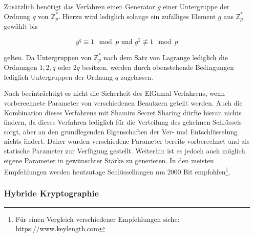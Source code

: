   Zusätzlich benötigt das Verfahren einen Generator \(g\) einer Untergruppe der Ordnung \(q\) von \(\mathbb{Z}_p^*\). Hierzu wird lediglich solange ein zufälliges Element \(g\) aus \(\mathbb{Z}_p^*\) gewählt bis 
  
  \[g^q \equiv 1 \mod p \text{ und } g^2 \not\equiv 1 \mod p\] 
  
  gelten. Da Untergruppen von \(\mathbb{Z}_p^*\) nach dem Satz von Lagrange lediglich die Ordnungen \(1, 2, q\) oder \(2q\) besitzen, werden durch obenstehende Bedingungen lediglich Untergruppen der Ordnung \(q\) zugelassen.
  
  Nach \cite{katz2014} beeinträchtigt es nicht die Sicherheit des ElGamal-Verfahrens, wenn vorberechnete Parameter von verschiedenen Benutzern geteilt werden. Auch die Kombination dieses Verfahrens mit Shamirs Secret Sharing dürfte hieran nichts ändern, da dieses Verfahren lediglich für die Verteilung des geheimen Schlüssels sorgt, aber an den grundlegenden Eigenschaften der Ver- und Entschlüsselung nichts ändert. Daher wurden verschiedene Parameter bereits vorberechnet und als statische Parameter zur Verfügung gestellt. Weiterhin ist es jedoch auch möglich eigene Parameter in gewünschter Stärke zu generieren.  In den meisten Empfehlungen werden heutzutage Schlüssellängen um 2000 Bit empfohlen\footnote{
    Für einen Vergleich verschiedener Empfehlungen siehe: https://www.keylength.com
  }.
  
  \subsubsection{Hybride Kryptographie}
  
  \label{sec_impl_threshold_hybrid}
  
%  
%  

